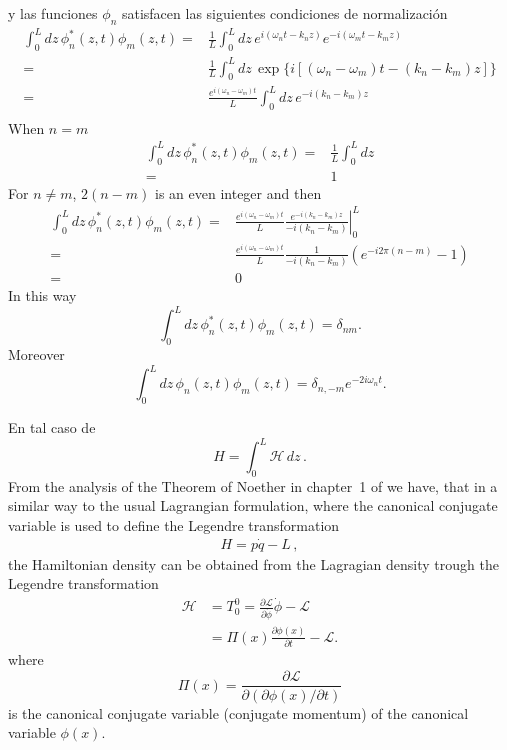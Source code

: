 \begin{frame}
y las funciones $\phi_n$ satisfacen las siguientes condiciones de normalizaci\'on
\begin{align}
  \int_0^Ldz\,\phi_n^*(z,t)\phi_m(z,t)=&\frac{1}{L}\int_0^Ldz\,e^{i(\omega_n t-k_n z)}e^{-i(\omega_m t-k_m z)}\nonumber\\
=&\frac{1}{L}\int_0^Ldz\,\exp\{i[(\omega_n-\omega_m) t-(k_n-k_m) z]\}\nonumber\\
=&\frac{e^{i(\omega_n-\omega_m)t}}{L}\int_0^Ldz\,e^{-i(k_n-k_m) z}\nonumber\\
\end{align}
When $n=m$
\begin{align}
    \int_0^Ldz\,\phi_n^*(z,t)\phi_m(z,t)=&\frac{1}{L}\int_0^Ldz\nonumber\\
    =&1
\end{align}
For $n\neq m$, $2(n-m)$ is an even integer and then
\begin{align}
   \int_0^Ldz\,\phi_n^*(z,t)\phi_m(z,t)  =&\frac{e^{i(\omega_n-\omega_m)t}}{L}\left.
\frac{e^{-i(k_n-k_m) z}}{-i(k_n-k_m)}\right|_0^L\nonumber\\
=&\frac{e^{i(\omega_n-\omega_m)t}}{L}\frac{1}{-i(k_n-k_m)}
\left(e^{-i2\pi(n-m) }-1\right)\nonumber\\
=&0
\end{align}
In this way
\begin{equation}
\label{eq:7}
  \int_0^Ldz\,\phi_n^*(z,t)\phi_m(z,t)=\delta_{nm}.
\end{equation}
Moreover
\begin{equation}
\label{eq:8}
  \int_0^Ldz\,\phi_n(z,t)\phi_m(z,t)=\delta_{n,-m}e^{-2i\omega_nt}.
\end{equation}

En tal caso de 
\begin{equation}
  \label{eq:9}
  H=\int_{0}^{L}\mathcal{H}\,dz\,.
\end{equation}
From the analysis of the Theorem of Noether in chapter~1 of \cite{lsm} we have, that in a similar way to the usual Lagrangian formulation, where the canonical conjugate  variable is used to define the Legendre transformation
\begin{align}
  \label{eq:10}
  H=p \dot q-L\,,
\end{align}
the Hamiltonian density can be obtained from the Lagragian density trough the Legendre transformation
\begin{align}
\mathcal{H}&=T^0_0=\frac{\partial\mathcal{L}}{\partial\dot{\phi}}\dot{\phi}
      -\mathcal{L}\\
      &=\Pi(x)\frac{\partial\phi(x)}{\partial t}-\mathcal{L}.
\end{align}
where
\begin{equation}
\label{eq:11}
  \Pi(x)=\frac{\partial\mathcal{L}}{\partial(\partial\phi(x)/\partial t)}
\end{equation}
is the canonical conjugate variable (conjugate momentum) of  the canonical variable $\phi(x)$.


\end{frame}
